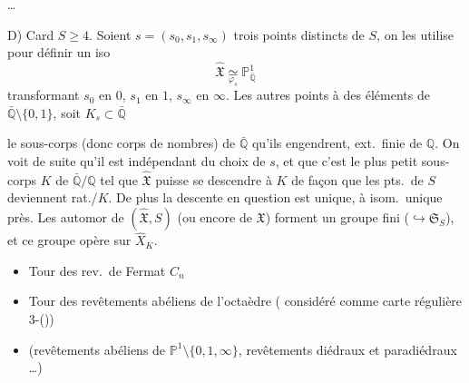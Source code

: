 \documentclass[11pt,a4paper]{article}
\begin{document}
\ldots

D) Card $S \geq 4$. Soient \struck{\ill{}} $s = (s_0, s_1, s_\infty)$  trois points distincts de $S$, on les utilise pour définir un iso
\[
  \hat{\mathfrak{X}} \underset{\varphi_s}{\simeq} \mathbb{P}^1_{\bar{\mathbb{Q}}}
\]
transformant $s_0$ en $0$, $s_1$ en $1$, $s_\infty$ en $\infty$. Les autres points  \struck{\ill{}} à des éléments de $\bar{\mathbb{Q}} \setminus \{0,1\}$, soit $K_s \subset \bar{\mathbb{Q}}$

le sous-corps (donc corps de nombres) de $\bar{\mathbb{Q}}$ qu'ils engendrent, ext.\ finie de $\mathbb{Q}$. On voit de suite qu'il est indépendant du choix de $s$, et que c'est le plus petit sous-corps $K$ de $\bar{\mathbb{Q}}/\mathbb{Q}$ tel que $\hat{\mathfrak{X}}$ puisse se descendre  à $K$ de façon que les pts.\ de $S$ deviennent rat./$K$. De plus la descente en question est unique, à isom.\ unique près. Les automor de $(\hat{\mathfrak{X}}, S)$ (ou encore de $\mathfrak{X}$) forment un groupe fini ($\hookrightarrow \mathfrak{S}_S$), et ce groupe opère  sur $\hat{X}_K$.

\begin{itemize}
  \item Tour des rev.\ de Fermat $C_n$
  \item Tour des revêtements abéliens de l'octaèdre (\struck{\ill{}} considéré comme carte régulière 3-()) \struck{\ill{}}
  \item (revêtements abéliens de $\mathbb{P}^1 \setminus \{0,1,\infty\}$, revêtements diédraux et paradiédraux \ldots)
\end{itemize}



\end{document}
